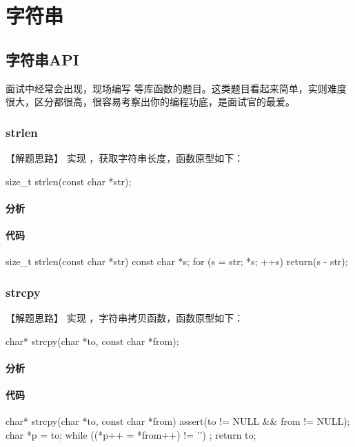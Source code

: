 \chapter{字符串}


\section{字符串API} %
面试中经常会出现，现场编写  等库函数的题目。这类题目看起来简单，实则难度很大，区分都很高，很容易考察出你的编程功底，是面试官的最爱。


\subsection{strlen}


【解题思路】
实现 ，获取字符串长度，函数原型如下：
\begin{Code}
size_t strlen(const char *str);
\end{Code}


\subsubsection{分析}



\subsubsection{代码}
\begin{Code}
size_t strlen(const char *str) {
    const char *s;
    for (s = str; *s; ++s) {}
    return(s - str);
}
\end{Code}


\subsection{strcpy}


【解题思路】
实现 ，字符串拷贝函数，函数原型如下：
\begin{Code}
char* strcpy(char *to, const char *from);
\end{Code}


\subsubsection{分析}



\subsubsection{代码}
\begin{Code}
char* strcpy(char *to, const char *from) {
    assert(to != NULL && from != NULL);
    char *p = to;
    while ((*p++ = *from++) != '\0')
        ;
    return to;
}
\end{Code}


